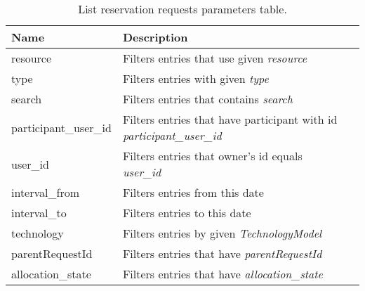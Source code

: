 \begin{table}[!ht]
    \begin{tabularx}{\textwidth}{llX}
        \toprule
        Name & Description \\
        \midrule
        resource & Filters entries that use given \emph{resource} \\
        type & Filters entries with given \emph{type} \\
        search & Filters entries that contains \emph{search} \\
        participant\_user\_id &  Filters entries that have participant with id \emph{participant\_user\_id} \\
        user\_id & Filters entries that owner's id equals \emph{user\_id} \\
        interval\_from & Filters entries from this date \\  
        interval\_to & Filters entries to this date \\
        technology & Filters entries by given \emph{TechnologyModel} \\
        parentRequestId & Filters entries that have \emph{parentRequestId} \\
        allocation\_state & Filters entries that have \emph{allocation\_state} \\
        \bottomrule
    \end{tabularx}
    \caption{List reservation requests parameters table.}
    \label{tab:res}
\end{table}

